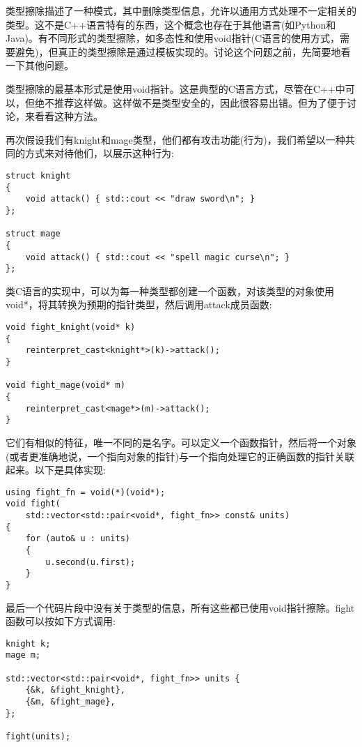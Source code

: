 类型擦除描述了一种模式，其中删除类型信息，允许以通用方式处理不一定相关的类型。这不是C++语言特有的东西，这个概念也存在于其他语言(如Python和Java)。有不同形式的类型擦除，如多态性和使用void指针(C语言的使用方式，需要避免)，但真正的类型擦除是通过模板实现的。讨论这个问题之前，先简要地看一下其他问题。

类型擦除的最基本形式是使用void指针。这是典型的C语言方式，尽管在C++中可以，但绝不推荐这样做。这样做不是类型安全的，因此很容易出错。但为了便于讨论，来看看这种方法。

再次假设我们有knight和mage类型，他们都有攻击功能(行为)，我们希望以一种共同的方式来对待他们，以展示这种行为:

\begin{lstlisting}[style=styleCXX]
struct knight
{
	void attack() { std::cout << "draw sword\n"; }
};

struct mage
{
	void attack() { std::cout << "spell magic curse\n"; }
};
\end{lstlisting}

类C语言的实现中，可以为每一种类型都创建一个函数，对该类型的对象使用void*，将其转换为预期的指针类型，然后调用attack成员函数:

\begin{lstlisting}[style=styleCXX]
void fight_knight(void* k)
{
	reinterpret_cast<knight*>(k)->attack();
}

void fight_mage(void* m)
{
	reinterpret_cast<mage*>(m)->attack();
}
\end{lstlisting}

它们有相似的特征，唯一不同的是名字。可以定义一个函数指针，然后将一个对象(或者更准确地说，一个指向对象的指针)与一个指向处理它的正确函数的指针关联起来。以下是具体实现:

\begin{lstlisting}[style=styleCXX]
using fight_fn = void(*)(void*);
void fight(
	std::vector<std::pair<void*, fight_fn>> const& units)
{
	for (auto& u : units)
	{
		u.second(u.first);
	}
}
\end{lstlisting}

最后一个代码片段中没有关于类型的信息，所有这些都已使用void指针擦除。fight函数可以按如下方式调用:

\begin{lstlisting}[style=styleCXX]
knight k;
mage m;

std::vector<std::pair<void*, fight_fn>> units {
	{&k, &fight_knight},
	{&m, &fight_mage},
};

fight(units);
\end{lstlisting}

